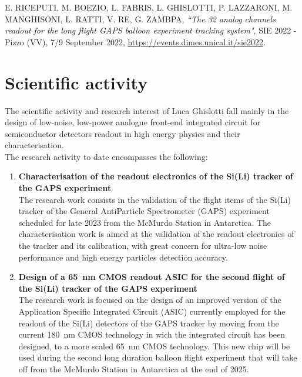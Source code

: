 \documentclass[11pt]{article}
\begin{document}
\noindent
E. RICEPUTI, M. BOEZIO, L. FABRIS, L. GHISLOTTI, P. LAZZARONI, M. MANGHISONI, L. RATTI, V. RE, G. ZAMBPA, \textit{``The 32 analog channels readout for the long flight GAPS balloon experiment tracking system"}, SIE 2022 - Pizzo (VV), 7/9 September 2022, \linebreak
\href{https://events.dimes.unical.it/sie2022/wp-content/uploads/sites/18/2022/08/Scheduling-oralposter-sessions.pdf}{https://events.dimes.unical.it/sie2022}.

\bigskip
\section*{Scientific activity}
The scientific activity and research interest of Luca Ghislotti fall mainly in the design of low-noise, low-power analogue front-end integrated circuit for semiconductor detectors readout in high energy physics and their characterisation.\\

\noindent
The research activity to date encompasses the following:
\begin{enumerate}
    \item \textbf{Characterisation of the readout electronics of the Si(Li) tracker of the GAPS experiment}\\The research work consists in the validation of the flight items of the Si(Li) tracker of the General AntiParticle Spectrometer (GAPS) experiment scheduled for late 2023 from the McMurdo Station in Antarctica. The characterisation work is aimed at the validation of the readout electronics of the tracker and its calibration, with great concern for ultra-low noise performance and high energy particles detection accuracy.
    \item \textbf{Design of a \SI{65}{\nano\meter} CMOS readout ASIC for the second flight of the Si(Li) tracker of the GAPS experiment}\\
    The research work is focused on the design of an improved version of the Application Specific Integrated Circuit (ASIC) currently employed for the readout of the Si(Li) detectors of the GAPS tracker by moving from the current \SI{180}{\nano\meter} CMOS technology in wich the integrated circuit has been designed, to a more scaled \SI{65}{\nano\meter} CMOS technology.  This new chip will be used during the second long duration balloon flight experiment that will take off from the McMurdo Station in Antarctica at the end of 2025.
\end{enumerate}
\end{document}
